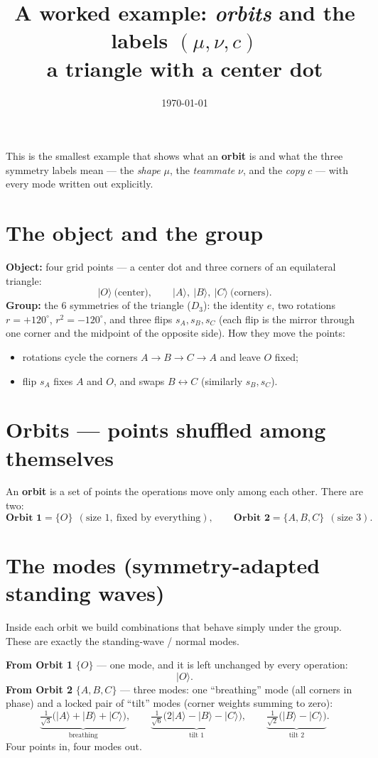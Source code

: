 \documentclass[11pt]{article}
\title{\vspace{-1.2cm}A worked example: \emph{orbits} and the labels $(\mu,\nu,c)$\\[2pt]
\normalsize a triangle with a center dot}
\author{}\date{\today}
\newcommand{\ket}[1]{\lvert #1\rangle}
\begin{document}
\maketitle\vspace{-0.7cm}

This is the smallest example that shows what an \textbf{orbit} is and what the three symmetry labels
mean --- the \emph{shape} $\mu$, the \emph{teammate} $\nu$, and the \emph{copy} $c$ --- with every mode
written out explicitly.

\section{The object and the group}
\textbf{Object:} four grid points --- a center dot and three corners of an equilateral triangle:
\[
   \ket{O}\ \text{(center)},\qquad \ket{A},\ \ket{B},\ \ket{C}\ \text{(corners)} .
\]
\textbf{Group:} the 6 symmetries of the triangle ($D_3$): the identity $e$, two rotations
$r=+120^\circ$, $r^2=-120^\circ$, and three flips $s_A,s_B,s_C$ (each flip is the mirror through one
corner and the midpoint of the opposite side). How they move the points:
\begin{itemize}\itemsep0pt
\item rotations cycle the corners $A\!\to\!B\!\to\!C\!\to\!A$ and leave $O$ fixed;
\item flip $s_A$ fixes $A$ and $O$, and swaps $B\leftrightarrow C$ (similarly $s_B,s_C$).
\end{itemize}

\section{Orbits --- points shuffled among themselves}
An \textbf{orbit} is a set of points the operations move only among each other. There are two:
\[
   \textbf{Orbit 1}=\{O\}\ \ (\text{size }1,\ \text{fixed by everything}),\qquad
   \textbf{Orbit 2}=\{A,B,C\}\ \ (\text{size }3).
\]

\section{The modes (symmetry-adapted standing waves)}
Inside each orbit we build combinations that behave simply under the group. These are exactly the
standing-wave / normal modes.

\textbf{From Orbit 1} $\{O\}$ --- one mode, and it is left unchanged by every operation:
\[
   \ket{O}.
\]
\textbf{From Orbit 2} $\{A,B,C\}$ --- three modes: one ``breathing'' mode (all corners in phase) and a
locked pair of ``tilt'' modes (corner weights summing to zero):
\[
   \underbrace{\tfrac{1}{\sqrt3}\big(\ket{A}+\ket{B}+\ket{C}\big)}_{\text{breathing}},\qquad
   \underbrace{\tfrac{1}{\sqrt6}\big(2\ket{A}-\ket{B}-\ket{C}\big)}_{\text{tilt }1},\qquad
   \underbrace{\tfrac{1}{\sqrt2}\big(\ket{B}-\ket{C}\big)}_{\text{tilt }2}.
\]
Four points in, four modes out.
\end{document}
